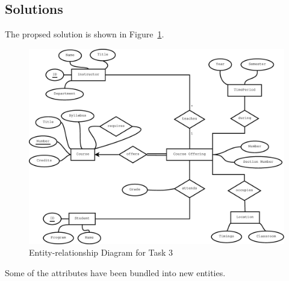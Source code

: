 \subsection{Solutions}
The propsed solution is shown in Figure~\ref{fig:task3}.

\begin{figure}[htbp]
  \centering
  \includegraphics[width=\linewidth]{include/task3.eps}
    \caption{Entity-relationship Diagram for Task 3}
  \label{fig:task3}
\end{figure}

Some of the attributes have been bundled into new entities.
